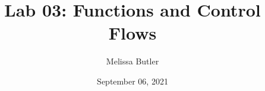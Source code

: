 \newcommand{\course}{MATH 3341}
\title{Lab 03: Functions and Control Flows}
\author{Melissa Butler}
\date{September 06, 2021}
